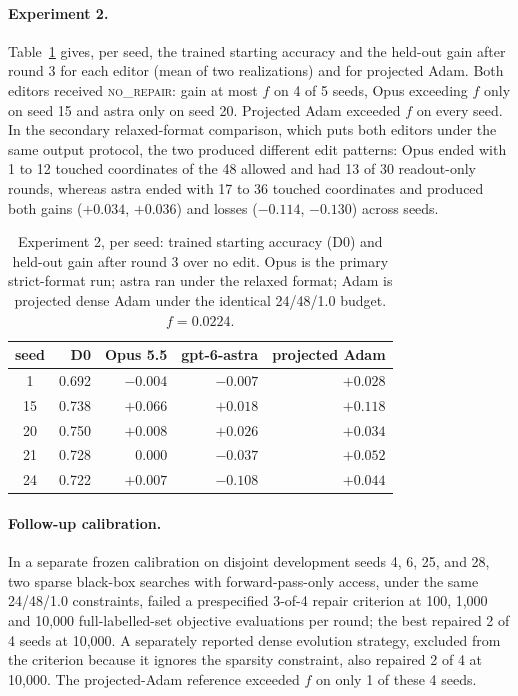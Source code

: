 \documentclass{article}
\begin{document}
\paragraph{Experiment 2.} Table~\ref{tab:results} gives, per seed, the trained starting accuracy and the held-out gain after round 3 for each editor (mean of two realizations) and for projected Adam. Both editors received \textsc{no\_repair}: gain at most $f$ on 4 of 5 seeds, Opus exceeding $f$ only on seed 15 and astra only on seed 20. Projected Adam exceeded $f$ on every seed. In the secondary relaxed-format comparison, which puts both editors under the same output protocol, the two produced different edit patterns: Opus ended with 1 to 12 touched coordinates of the 48 allowed and had 13 of 30 readout-only rounds, whereas astra ended with 17 to 36 touched coordinates and produced both gains ($+0.034$, $+0.036$) and losses ($-0.114$, $-0.130$) across seeds.

\begin{table}[t]
\centering
\caption{Experiment 2, per seed: trained starting accuracy (D0) and held-out gain after round 3 over no edit. Opus is the primary strict-format run; astra ran under the relaxed format; Adam is projected dense Adam under the identical 24/48/1.0 budget. $f = 0.0224$.}
\label{tab:results}
\small
\begin{tabular}{crrrr}
\toprule
seed & D0 & Opus 5.5 & gpt-6-astra & projected Adam \\
\midrule
1  & 0.692 & $-0.004$ & $-0.007$ & $+0.028$ \\
15 & 0.738 & $+0.066$ & $+0.018$ & $+0.118$ \\
20 & 0.750 & $+0.008$ & $+0.026$ & $+0.034$ \\
21 & 0.728 & $\phantom{+}0.000$ & $-0.037$ & $+0.052$ \\
24 & 0.722 & $+0.007$ & $-0.108$ & $+0.044$ \\
\bottomrule
\end{tabular}
\end{table}

\paragraph{Follow-up calibration.} In a separate frozen calibration on disjoint development seeds 4, 6, 25, and 28, two sparse black-box searches with forward-pass-only access, under the same 24/48/1.0 constraints, failed a prespecified 3-of-4 repair criterion at 100, 1,000 and 10,000 full-labelled-set objective evaluations per round; the best repaired 2 of 4 seeds at 10,000. A separately reported dense evolution strategy, excluded from the criterion because it ignores the sparsity constraint, also repaired 2 of 4 at 10,000. The projected-Adam reference exceeded $f$ on only 1 of these 4 seeds.
\end{document}
